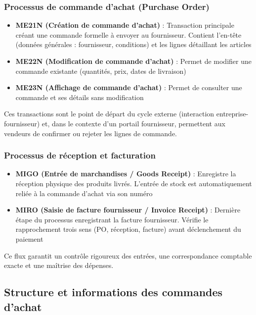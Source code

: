 \documentclass[12pt,a4paper,oneside]{report}
\begin{document}
\subsubsection{Processus de commande d'achat (Purchase Order)}\label{ch2:mm-flux-commande}

\begin{itemize}[label=\textbullet, itemsep=0.2em]
	\item \textbf{ME21N (Création de commande d'achat)} : Transaction principale créant une commande formelle à envoyer au fournisseur. Contient l'en-tête (données générales : fournisseur, conditions) et les lignes détaillant les articles
	\item \textbf{ME22N (Modification de commande d'achat)} : Permet de modifier une commande existante (quantités, prix, dates de livraison)
	\item \textbf{ME23N (Affichage de commande d'achat)} : Permet de consulter une commande et ses détails sans modification
\end{itemize}

Ces transactions sont le point de départ du cycle externe (interaction entreprise-fournisseur) et, dans le contexte 
d'un portail fournisseur, permettent aux vendeurs de confirmer ou rejeter les lignes de commande.

\subsubsection{Processus de réception et facturation}\label{ch2:mm-flux-reception}

\begin{itemize}[label=---, itemsep=0.15em]
	\item \textbf{MIGO (Entrée de marchandises / Goods Receipt)} : Enregistre la réception physique des produits livrés. L'entrée de stock est automatiquement reliée à la commande d'achat via son numéro
	\item \textbf{MIRO (Saisie de facture fournisseur / Invoice Receipt)} : Dernière étape du processus enregistrant la facture fournisseur. Vérifie le rapprochement trois sens (PO, réception, facture) avant déclenchement du paiement
\end{itemize}

Ce flux garantit un contrôle rigoureux des entrées, une correspondance comptable exacte et une maîtrise des dépenses.

\subsection{Structure et informations des commandes d'achat}\label{ch2:mm-purchase-order}
\end{document}

